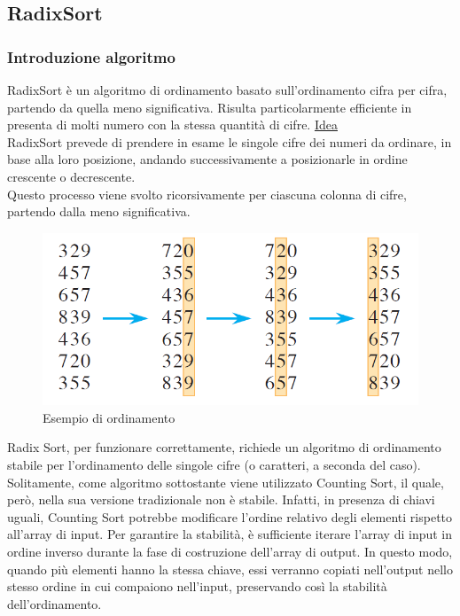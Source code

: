 \documentclass[a4paper, 11pt]{article}
\begin{document}
\subsection{RadixSort}
\subsubsection*{Introduzione algoritmo}
RadixSort è un algoritmo di ordinamento basato sull'ordinamento cifra per cifra, partendo da quella meno significativa. Risulta particolarmente efficiente in presenta di molti numero con la stessa quantità di cifre.\bigbreak
\noindent \underline{Idea}\\
RadixSort prevede di prendere in esame le singole cifre dei numeri da ordinare, in base alla loro posizione, andando successivamente a posizionarle in ordine crescente o decrescente.\\
Questo processo viene svolto ricorsivamente per ciascuna colonna di cifre, partendo dalla meno significativa.

\begin{figure}[H]
    \centering
    \includegraphics[scale=0.5]{./Immagini_EX/RadixSort.png}
    \caption*{Esempio di ordinamento}
\end{figure}

\noindent Radix Sort, per funzionare correttamente, richiede un algoritmo di ordinamento stabile per l'ordinamento delle singole cifre (o caratteri, a seconda del caso).\bigbreak
\noindent Solitamente, come algoritmo sottostante viene utilizzato Counting Sort, il quale, però, nella sua versione tradizionale non è stabile. Infatti, in presenza di chiavi uguali, Counting Sort potrebbe modificare l'ordine relativo degli elementi rispetto all'array di input.\bigbreak
\noindent Per garantire la stabilità, è sufficiente iterare l'array di input in ordine inverso durante la fase di costruzione dell'array di output. In questo modo, quando più elementi hanno la stessa chiave, essi verranno copiati nell'output nello stesso ordine in cui compaiono nell'input, preservando così la stabilità dell'ordinamento.
\end{document}
